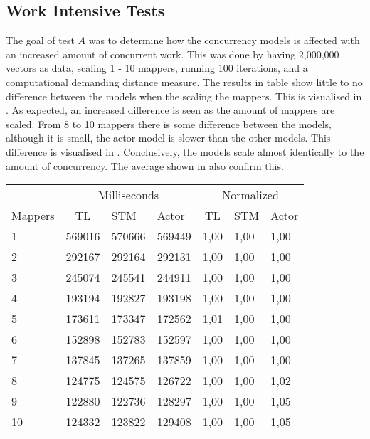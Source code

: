 \subsection{Work Intensive Tests}
The goal of test $A$ was to determine how the concurrency models is affected with an increased amount of concurrent work. This was done by having 2,000,000 vectors as data, scaling 1 - 10 mappers, running 100 iterations, and a computational demanding distance measure. The results in table  show little to no difference between the models when the scaling the mappers. This is visualised in . As expected, an increased difference is seen as the amount of mappers are scaled. From 8 to 10 mappers there is some difference between the models, although it is small, the actor model is slower than the other models. This difference is visualised in . Conclusively, the models scale almost identically to the amount of concurrency. The average shown in  also confirm this.
%
\begin{center}
\begin{table}[h]
\centering
\begin{tabular}{l|cll|cll}
             & \multicolumn{3}{c|}{Milliseconds} & \multicolumn{3}{c}{Normalized} \\
Mappers & TL     & STM     & Actor     & TL      & STM      & Actor     \\ \hline
1   &   569016	  &      570666      &    569449	&  1,00   & 1,00 &    1,00    \\
2   &   292167      &      292164      &    292131  &  1,00   & 1,00 &    1,00    \\
3   &   245074      &      245541      &    244911  &  1,00   & 1,00 &    1,00    \\
4   &   193194      &      192827      &    193198  &  1,00   & 1,00 &    1,00    \\
5   &   173611      &      173347      &    172562  &  1,01   & 1,00 &    1,00    \\
6   &   152898      &      152783      &    152597  &  1,00   & 1,00 &    1,00    \\
7   &   137845      &      137265      &    137859  &  1,00   & 1,00 &    1,00    \\
8   &   124775      &      124575      &    126722  &  1,00   & 1,00 &    1,02    \\
9   &   122880      &      122736      &    128297  &  1,00   & 1,00 &    1,05    \\
10 &   124332      &      123822      &    129408  &  1,00   & 1,00 &    1,05    \\
\end{tabular}
\label{table:test_results_a}
\end{table}
\end{center}
